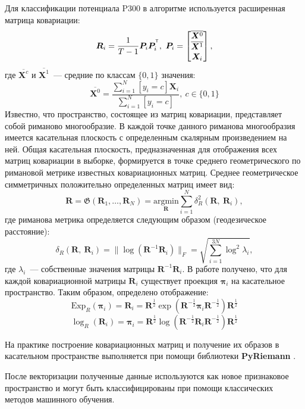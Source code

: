 \documentclass[a4paper, 12pt]{extarticle}
\begin{document}
Для классификации потенциала P300 в алгоритме используется расширенная матрица ковариации:
$$\bm{R}_i = \dfrac{1}{T-1} \bm{P}_i\bm{P}_i^{^{\mathsf{T}}},~\bm{P}_i = \begin{bmatrix}
	\overline{\bm{X}^0}\\
	\overline{\bm{X}^1}\\
	\bm{X}_i
	\end{bmatrix},$$
где $\overline{\bm{X}^c}$ и $\overline{\bm{X}^1}$~--- средние по классам $\{0,1\}$ значения:
$$\overline{\bm{X}^0} = \dfrac{\sum_{i = 1}^N\left[y_i = c\right] \bm{X}_i}{\sum_{i = 1}^N\left[y_i = c\right]},~c\in\{0,1\}$$
Известно, что пространство, состоящее из матриц ковариации, представляет собой 
риманово многообразие\citep{barachant2010riemannian}. 
В каждой точке данного риманова многообразия имеется касательная плоскость с 
определенным скалярным произведением на ней. Общая касательная плоскость, 
предназначенная для отображения всех матриц ковариации в выборке, 
формируется в точке среднего геометрического по римановой метрике 
известных ковариационных матриц. Среднее геометрическое симметричных положительно определенных матриц имеет вид:
$$\bm{R} = \mathfrak{G}\left(\bm{R}_1,\dots,\bm{R}_N\right) = \underset{\bm{R}}{\text{argmin}}\sum_{i = 1}^N
\delta^2_R(\bm{R},~\bm{R}_i),$$
где риманова метрика определяется следующим образом (геодезическое расстояние):
$$\delta_R(\bm{R},~\bm{R}_i) = \|\log (\bm{R}^{-1}\bm{R}_i)\|_F = \sqrt{\sum_{i = 1}^{3N} \log^2\lambda_i},$$
где $\lambda_i$~--- собственные значения матрицы $\bm{R}^{-1}\bm{R}_i$. В работе \citep{barachant2010riemannian}
получено, что для каждой ковариационной матрицы $\bm{R}_i$ существует проекция $\bm{\pi}_i$ на касательное пространство.
Таким образом, определено отображение:
$$\text{Exp}_{R}(\bm{\pi}_i) = \bm{R}_i = \bm{R}^{\frac{1}{2}} \exp\left(\bm{R}^{-\frac{1}{2}}\bm{\pi}_i\bm{R}^{-\frac{1}{2}}\right) \bm{R}^{\frac{1}{2}}$$
$$\log_{R}(\bm{R}_i) = \bm{\pi}_i = \bm{R}^{\frac{1}{2}} \log\left(\bm{R}^{-\frac{1}{2}}\bm{R}_i\bm{R}^{-\frac{1}{2}}\right) \bm{R}^{\frac{1}{2}}$$

На практике построение ковариационных матриц и получение их образов в касательном пространстве выполняется 
при помощи библиотеки \textbf{PyRiemann} \citep{congedo2013new}.

После векторизации полученные данные используются как новое признаковое пространство и 
могут быть классифицированы при помощи классических методов машинного обучения. 

\end{document}
